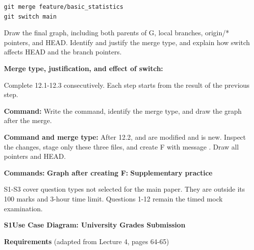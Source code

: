 \begin{verbatim}
git merge feature/basic_statistics
git switch main
\end{verbatim}
Draw the final graph, including both parents of G, local branches, origin/* pointers, and HEAD. Identify and justify the merge type, and explain how switch affects HEAD and the branch pointers.\par
\blankbox{6cm}
\textbf{Merge type, justification, and effect of switch:}\par
\blankbox{2.5cm}
\newpage
{}
Complete 12.1-12.3 consecutively. Each step starts from the result of the previous step.\par
\begin{center}\startgitFF\end{center}
\textbf{Command:}
\blankbox{4.5cm}
Write the command, identify the merge type, and draw the graph after the merge.\par
\textbf{Command and merge type:}
\blankbox{4.5cm}
\newpage
{}
After 12.2,  and  are modified and  is new. Inspect the changes, stage only these three files, and create F with message . Draw all pointers and HEAD.\par
\textbf{Commands:}
\blankbox{6cm}
\textbf{Graph after creating F:}
\blankbox{10cm}
\ifMockExamSupplements
\newpage
\textbf{\Large Supplementary practice}\par
S1-S3 cover question types not selected for the main paper. They are outside its 100 marks and 3-hour time limit. Questions 1-12 remain the timed mock examination.\par
\medskip
\textbf{S1\quad Use Case Diagram: University Grades Submission}\par
\textbf{Requirements} (adapted from Lecture 4, pages 64-65)\par
